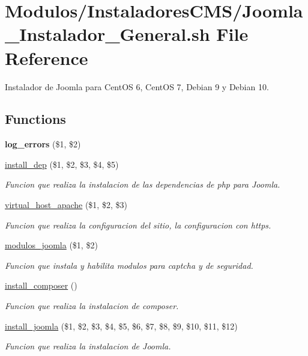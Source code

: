 \hypertarget{Joomla__Instalador__General_8sh}{}\section{Modulos/\+Instaladores\+C\+M\+S/\+Joomla\+\_\+\+Instalador\+\_\+\+General.sh File Reference}
\label{Joomla__Instalador__General_8sh}


Instalador de Joomla para Cent\+OS 6, Cent\+OS 7, Debian 9 y Debian 10.  


\subsection*{Functions}
\begin{DoxyCompactItemize}
\item 
\mbox{\label{Joomla__Instalador__General_8sh_a92067b58a8478c9841b2cd9b75ea3565}} 
{\bfseries log\+\_\+errors} (\$1, \$2)
\item 
\hyperlink{Joomla__Instalador__General_8sh_a867cb91b69b68d903ea8d2ebcff6ea36}{install\+\_\+dep} (\$1, \$2, \$3, \$4, \$5)
\begin{DoxyCompactList}\small\item\em Funcion que realiza la instalacion de las dependencias de php para Joomla. \end{DoxyCompactList}\item 
\hyperlink{Joomla__Instalador__General_8sh_a2ea632f8e04de9564521b12cf10c47f4}{virtual\+\_\+host\+\_\+apache} (\$1, \$2, \$3)
\begin{DoxyCompactList}\small\item\em Funcion que realiza la configuracion del sitio, la configuracion con https. \end{DoxyCompactList}\item 
\hyperlink{Joomla__Instalador__General_8sh_a3a17cfb1d7aa0bd1433900e4d4141cdb}{modulos\+\_\+joomla} (\$1, \$2)
\begin{DoxyCompactList}\small\item\em Funcion que instala y habilita modulos para captcha y de seguridad. \end{DoxyCompactList}\item 
\hyperlink{Joomla__Instalador__General_8sh_a9cbb91389a71b89c6cab0848d688e423}{install\+\_\+composer} ()
\begin{DoxyCompactList}\small\item\em Funcion que realiza la instalacion de composer. \end{DoxyCompactList}\item 
\hyperlink{Joomla__Instalador__General_8sh_a43fed5b5e461aa386546fdcc766aa29e}{install\+\_\+joomla} (\$1, \$2, \$3, \$4, \$5, \$6, \$7, \$8, \$9, \$10, \$11, \$12)
\begin{DoxyCompactList}\small\item\em Funcion que realiza la instalacion de Joomla. \end{DoxyCompactList}\end{DoxyCompactItemize}


